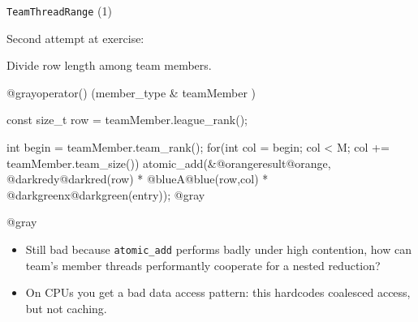 \iffull
\begin{frame}[fragile]{\texttt{TeamThreadRange} (1)}


  Second attempt at exercise:

\vspace{10pt}
  Divide row length among team members.

  \begin{code}
@grayoperator() (member_type & teamMember ) {
  const size_t row = teamMember.league_rank();

  int begin = teamMember.team_rank();
  for(int col = begin; col < M; col += teamMember.team_size()) {
    atomic_add(&@orangeresult@orange, @darkredy@darkred(row) * @blueA@blue(row,col) * @darkgreenx@darkgreen(entry));
  }
@gray}@gray
  \end{code}

  \pause
  \vspace{-5pt}

  \begin{itemize}

  \item {Still bad because \texttt{atomic\_add} performs badly under high contention, how can team's member threads performantly cooperate for a nested reduction?}

  \item {On CPUs you get a bad data access pattern: this hardcodes coalesced access, but not caching.}

  \end{itemize}

\end{frame}
\fi


